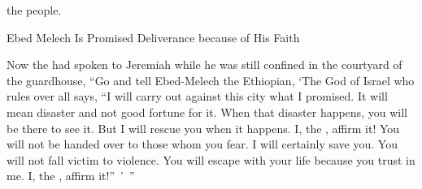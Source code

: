 {the people.
\par }{\SH Ebed Melech Is Promised Deliverance because of His Faith
\par }{\PP {}Now the
{}
had
spoken to Jeremiah
while
he was still confined
in the courtyard
of the guardhouse,
“Go
and tell
Ebed-Melech
the Ethiopian,
‘The
{}
God
of Israel
who rules over all
says,
“I
will carry out
against
this
city
what I promised.
It will mean disaster
and not
good fortune
for it. When that
disaster happens, you will be there to see it.
But I will
rescue
you
when
it happens. I, the
{}, affirm
it! You will not
be handed
over to those whom
you
fear.
I will certainly
save
you. You will not
fall
victim to violence.
You will escape with your life
because
you trust
in me. I, the
{}, affirm it!” ’ ”

}
